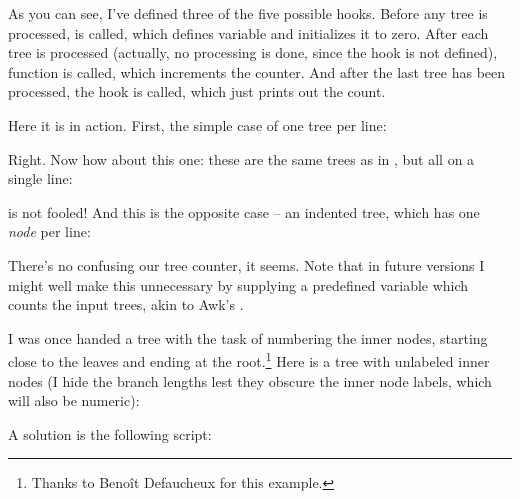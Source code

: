 
As you can see, I've defined three of the five possible hooks. Before any tree
is processed,  is called, which defines variable
 and initializes it to zero. After each tree is processed
(actually, no processing is done, since the  hook is not defined),
function  is called, which increments the counter. And after
the last tree has been processed, the  hook is called, which
just prints out the count.

Here it is in action. First, the simple case of one tree per line:



%
Right. Now how about this one: these are the same trees as in
, but all on a single line:



\luaed{} is not fooled! And this is the opposite case -- an indented tree, which has one {\em node} per line:



There's no confusing our tree counter, it seems. Note that in future versions I
might well make this unnecessary by supplying a predefined variable which counts
the input trees, akin to Awk's .


I was once handed a tree with the task of numbering the inner nodes, starting
close to the leaves and ending at the root.\footnote{Thanks to Beno\^{i}t
Defaucheux for this example.} Here is a tree with unlabeled inner nodes (I hide
the branch lengths lest they obscure the inner node labels, which will also be
numeric):

\startalignment[center]
\externalfigure[ed_22_svg]
\stopalignment

A solution is the following \luaed{} script:


